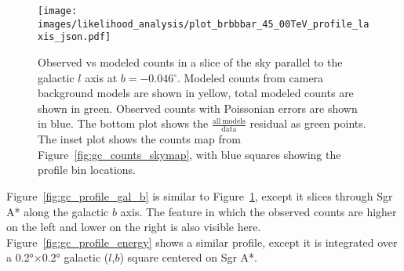   \begin{figure}[t]
    \centering
    \texttt{[image: images/likelihood\_analysis/plot\_brbbbar\_45\_00TeV\_profile\_laxis\_json.pdf]}
    \caption[Galactic Center Profile vs Galactic $l$]{
      Observed vs modeled counts in a slice of the sky parallel to the galactic $l$ axis at $b=-0.046{}^{\circ}$.
      Modeled counts from camera background models are shown in yellow, total modeled counts are shown in green.
      Observed counts with Poissonian errors are shown in blue.
      The bottom plot shows the $\frac{\mathrm{all\:models}}{\mathrm{data}}$ residual as green points.
      The inset plot shows the counts map from Figure~\ref{fig:gc_counts_skymap}, with blue squares showing the profile bin locations.
    }
    \label{fig:gc_profile_gal_l}
  \end{figure}

  Figure~\ref{fig:gc_profile_gal_b} is similar to Figure~\ref{fig:gc_profile_gal_l}, except it slices through Sgr A* along the galactic $b$ axis.
  The feature in which the observed counts are higher on the left and lower on the right is also visible here.
  Figure~\ref{fig:gc_profile_energy} shows a similar profile, except it is integrated over a \ang{0.2}$\times$\ang{0.2} galactic ($l$,$b$) square centered on Sgr A*.

